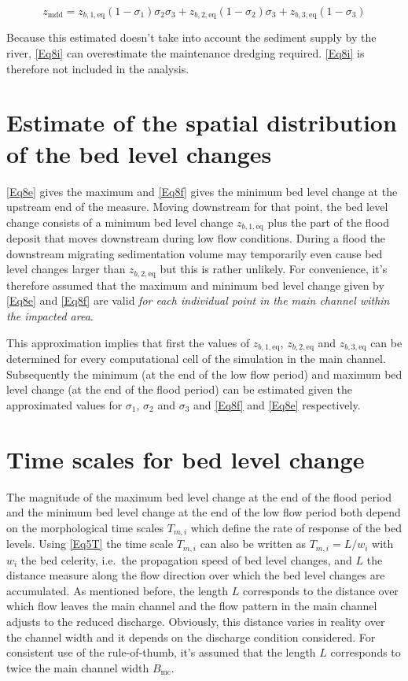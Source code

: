 \begin{equation}
z_\text{mdd} = z_{b,1,\text{eq}}(1-\sigma_1) \sigma_2 \sigma_3 + z_{b,2,\text{eq}} (1-\sigma_2) \sigma_3 + z_{b,3,\text{eq}} (1-\sigma_3)
\label{Eq8i}
\end{equation}

Because this estimated doesn't take into account the sediment supply by the river, \autoref{Eq8i} can overestimate the maintenance dredging required.
\autoref{Eq8i} is therefore not included in the \dfastmi analysis.

\section{Estimate of the spatial distribution of the bed level changes}

\autoref{Eq8e} gives the maximum and \autoref{Eq8f} gives the minimum bed level change at the upstream end of the measure.
Moving downstream for that point, the bed level change consists of a minimum bed level change $z_{b,1,\text{eq}}$ plus the part of the flood deposit that moves downstream during low flow conditions.
During a flood the downstream migrating sedimentation volume may temporarily even cause bed level changes larger than $z_{b,2,\text{eq}}$ but this is rather unlikely.
For convenience, it's therefore assumed that the maximum and minimum bed level change given by \autoref{Eq8e} and \autoref{Eq8f} are valid \emph{for each individual point in the main channel within the impacted area}.

This approximation implies that first the values of $z_{b,1,\text{eq}}$, $z_{b,2,\text{eq}}$ and $z_{b,3,\text{eq}}$ can be determined for every computational cell of the simulation in the main channel.
Subsequently the minimum (at the end of the low flow period) and maximum bed level change (at the end of the flood period) can be estimated given the approximated values for $\sigma_1$, $\sigma_2$ and $\sigma_3$ and \autoref{Eq8f} and \autoref{Eq8e} respectively.

\section{Time scales for bed level change}

The magnitude of the maximum bed level change at the end of the flood period and the minimum bed level change at the end of the low flow period both depend on the morphological time scales $T_{m,i}$  which define the rate of response of the bed levels.
Using \autoref{Eq5T} the time scale $T_{m,i}$ can also be written as $T_{m,i} = L/w_i$ with $w_i$ the bed celerity, i.e.~the propagation speed of bed level changes, and $L$ the distance measure along the flow direction over which the bed level changes are accumulated.
As mentioned before, the length $L$ corresponds to the distance over which flow leaves the main channel and the flow pattern in the main channel adjusts to the reduced discharge.
Obviously, this distance varies in reality over the channel width and it depends on the discharge condition considered.
For consistent use of the rule-of-thumb, it's assumed that the length $L$ corresponds to twice the main channel width $B_\text{mc}$.

